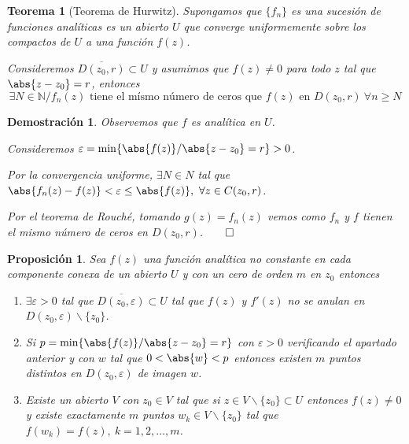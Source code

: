 \documentclass[10pt]{book}
\newtheorem{theorem}{Teorema}[chapter]
\newtheorem{prop}{Proposición}[chapter]
\newtheorem*{dem}{Demostración}
\newcommand{\N}{\mathbb{N}}
\begin{document}
\begin{theorem}[Teorema de Hurwitz]
Supongamos que $\{f_n\}$ es una sucesión de funciones analíticas es un abierto $U$ que converge uniformemente sobre los compactos de $U$ a una función $f(z)$.

Consideremos $\overline{D(z_0,r)}\subset U$ y asumimos que $f(z)\neq 0$ para todo $z$ tal que $\abs{z-z_0}=r$, entonces
$$
\exists N\in\N / f_n(z) \text{ tiene el mísmo número de ceros que } f(z) \text{ en } D(z_0,r)\ \forall n\geq N
$$
\end{theorem}

\begin{dem}
Observemos que $f$ es analítica en $U$.

Consideremos $\varepsilon = \min\{\abs{f(z)}/\abs{z-z_0}= r\}>0$.

Por la convergencia uniforme, $\exists N \in N$ tal que $\abs{f_n(z)-f(z)}<\varepsilon \leq \abs{f(z)},\ \forall z\in C(z_0,r)$.

Por el teorema de Rouché, tomando $g(z) = f_n(z)$ vemos como $f_n$ y $f$ tienen el mismo número de ceros en $D(z_0,r)$.$\qed$
\end{dem}

\begin{prop}
Sea $f(z)$ una función analítica no constante en cada componente conexa de un abierto $U$ y con un cero de orden $m$ en $z_0$ entonces 
\begin{enumerate}
\item $\exists \varepsilon>0$ tal que $\overline{D(z_0,\varepsilon)}\subset U$ tal que $f(z)$ y $f'(z)$ no se anulan en $D(z_0,\varepsilon)\backslash\{z_0\}$.
\item Si $p = \min\{\abs{f(z)}/ \abs{z-z_0}=r\}$ con $\varepsilon >0$ verificando el apartado anterior y con $w$ tal que $0<\abs{w}<p$ entonces existen $m$ puntos distintos en $D(z_0,\varepsilon)$ de imagen $w$.
\item Existe un abierto $V$ con $z_0\in V$ tal que si $z\in V\backslash\{z_0\}\subset U$ entonces $f(z)\neq 0$ y existe exactamente $m$ puntos $w_k\in V\backslash\{z_0\}$ tal que $f(w_k) = f(z),\ k = 1,2,\ldots,m$.
\end{enumerate}
\end{prop}
\end{document}
